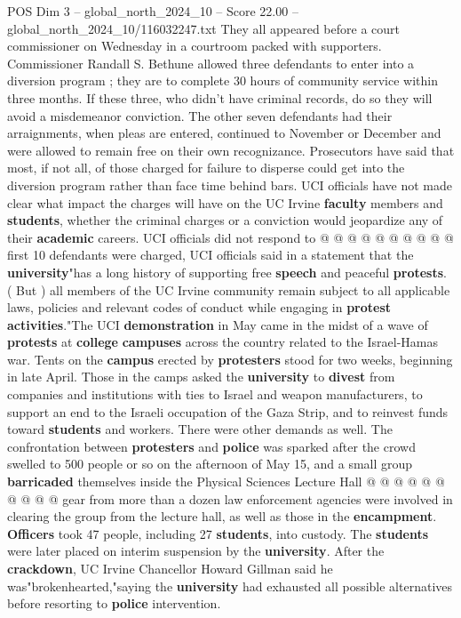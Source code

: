 \begin{textsample}{POS Dim 3 – global\_north\_2024\_10 – Score 22.00 – global\_north\_2024\_10/116032247.txt}
They all appeared before a court commissioner on Wednesday in a courtroom packed with supporters.
Commissioner Randall S.
Bethune allowed three defendants to enter into a diversion program ; they are to complete 30 hours of community service within three months.
If these three, who didn't have criminal records, do so they will avoid a misdemeanor conviction.
The other seven defendants had their arraignments, when pleas are entered, continued to November or December and were allowed to remain free on their own recognizance.
Prosecutors have said that most, if not all, of those charged for failure to disperse could get into the diversion program rather than face time behind bars.
UCI officials have not made clear what impact the charges will have on the UC Irvine \textbf{faculty} members and \textbf{students}, whether the criminal charges or a conviction would jeopardize any of their \textbf{academic} careers.
UCI officials did not respond to @ @ @ @ @ @ @ @ @ @ first 10 defendants were charged, UCI officials said in a statement that the \textbf{university}"has a long history of supporting free \textbf{speech} and peaceful \textbf{protests}. ( But ) all members of the UC Irvine community remain subject to all applicable laws, policies and relevant codes of conduct while engaging in \textbf{protest} \textbf{activities}."The UCI \textbf{demonstration} in May came in the midst of a wave of \textbf{protests} at \textbf{college} \textbf{campuses} across the country related to the Israel-Hamas war.
Tents on the \textbf{campus} erected by \textbf{protesters} stood for two weeks, beginning in late April.
Those in the camps asked the \textbf{university} to \textbf{divest} from companies and institutions with ties to Israel and weapon manufacturers, to support an end to the Israeli occupation of the Gaza Strip, and to reinvest funds toward \textbf{students} and workers.
There were other demands as well.
The confrontation between \textbf{protesters} and \textbf{police} was sparked after the crowd swelled to 500 people or so on the afternoon of May 15, and a small group \textbf{barricaded} themselves inside the Physical Sciences Lecture Hall @ @ @ @ @ @ @ @ @ @ gear from more than a dozen law enforcement agencies were involved in clearing the group from the lecture hall, as well as those in the \textbf{encampment}. \textbf{Officers} took 47 people, including 27 \textbf{students}, into custody.
The \textbf{students} were later placed on interim suspension by the \textbf{university}.
After the \textbf{crackdown}, UC Irvine Chancellor Howard Gillman said he was"brokenhearted,"saying the \textbf{university} had exhausted all possible alternatives before resorting to \textbf{police} intervention.

\end{textsample}
